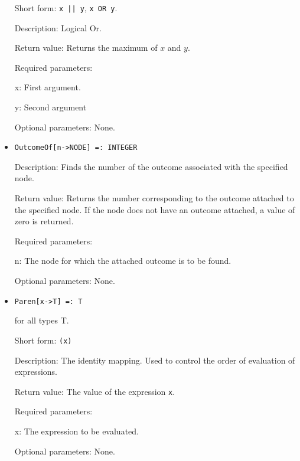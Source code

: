 \begin{itemize}
\bd
\item
[Short form:] \verb+x || y+, \verb+x OR y+.
\item
[Description:] Logical Or.
\item
[Return value:] Returns the maximum of $x$ and $y$.  
\item
[Required parameters:]\hfil\null
\bd
\item
[x:] First argument.  
\item
[y:] Second argument
\ed
\item
[Optional parameters:] None.
\ed



\item

\protect \large \begin{verbatim}
OutcomeOf[n->NODE] =: INTEGER
\end{verbatim}\normalsize

\bd

\item
[Description:] Finds the number of the outcome associated with the
specified node.
\item
[Return value:] Returns the number corresponding to the outcome
attached to the specified node.  If the node does not have an outcome
attached, a value of zero is returned.
\item
[Required parameters:]\hfil\null
	
\bd
\item
[n:] The node for which the attached outcome is to be found.
\ed

\item
[Optional parameters:] None.
\ed


\item
\protect \large \begin{verbatim}
Paren[x->T] =: T
\end{verbatim}\normalsize

for all types T.

\bd
\item
[Short form:] \verb+(x)+
\item
[Description:] The identity mapping.  Used to control the order of evaluation
of expressions.
\item
[Return value:] The value of the expression \verb+x+.
\item
[Required parameters:]\hfil\null
\bd
\item
[x:] The expression to be evaluated.
\ed
\item
[Optional parameters:] None.
\ed


\end{itemize}
